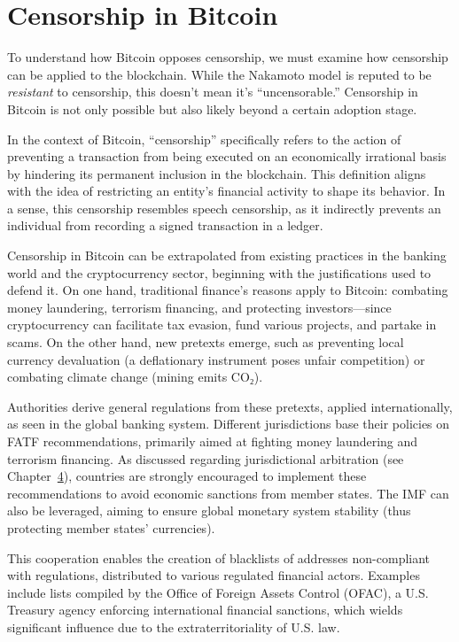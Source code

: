 \documentclass[
  a5paper,
  smalldemyvopaper,10pt,twoside,onecolumn,openright,extrafontsizes,hidelinks]{memoir}
\begin{document}
\section*{Censorship in Bitcoin}\label{la-censure-dans-bitcoin}


To understand how Bitcoin opposes censorship, we must examine how
censorship can be applied to the blockchain. While the Nakamoto model is
reputed to be \emph{resistant} to censorship, this doesn't mean it's
``uncensorable.'' Censorship in Bitcoin is not only possible but also
likely beyond a certain adoption stage.

In the context of Bitcoin, ``censorship'' specifically refers to the
action of preventing a transaction from being executed on an
economically irrational basis by hindering its permanent inclusion in
the blockchain. This definition aligns with the idea of restricting an
entity's financial activity to shape its behavior. In a sense, this
censorship resembles speech censorship, as it indirectly prevents an
individual from recording a signed transaction in a ledger.

Censorship in Bitcoin can be extrapolated from existing practices in the
banking world and the cryptocurrency sector, beginning with the
justifications used to defend it. On one hand, traditional finance's
reasons apply to Bitcoin: combating money laundering, terrorism
financing, and protecting investors---since cryptocurrency can
facilitate tax evasion, fund various projects, and partake in scams. On
the other hand, new pretexts emerge, such as preventing local currency
devaluation (a deflationary instrument poses unfair competition) or
combating climate change (mining emits CO₂).

Authorities derive general regulations from these pretexts, applied
internationally, as seen in the global banking system. Different
jurisdictions base their policies on FATF recommendations, primarily
aimed at fighting money laundering and terrorism financing. As discussed
regarding jurisdictional arbitration (see
Chapter~\hyperref[ch:adversaire]{4}), countries are strongly encouraged
to implement these recommendations to avoid economic sanctions from
member states. The IMF can also be leveraged, aiming to ensure global
monetary system stability (thus protecting member states' currencies).

This cooperation enables the creation of blacklists of addresses
non-compliant with regulations, distributed to various regulated
financial actors. Examples include lists compiled by the Office of
Foreign Assets Control (OFAC), a U.S. Treasury agency enforcing
international financial sanctions, which wields significant influence
due to the extraterritoriality of U.S. law.
\end{document}
